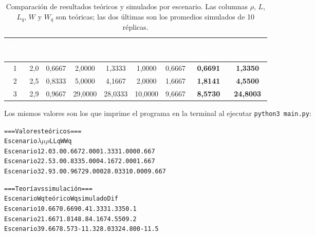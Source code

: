 \documentclass[11pt,a4paper]{article}
\renewcommand{\arraystretch}{1.08}
\begin{document}
\begin{table}[h!]
\centering
\setlength{\arrayrulewidth}{0.75pt}
\renewcommand{\arraystretch}{1.3}
\small
\begin{tabular}{|c|c|c|c|c|c|c|c|c|}
\hline
\rowcolor{headerblue}
\textbf{\textcolor{white}{Esc.}} &
\textbf{\textcolor{white}{$\lambda$}} &
\textbf{\textcolor{white}{$\rho$}} &
\textbf{\textcolor{white}{$L$}} &
\textbf{\textcolor{white}{$L_q$}} &
\textbf{\textcolor{white}{$W$}} &
\textbf{\textcolor{white}{$W_q$}} &
\makecell{\textbf{\textcolor{white}{Espera}} \\ \textbf{\textcolor{white}{simulada}}} &
\makecell{\textbf{\textcolor{white}{Cola}} \\ \textbf{\textcolor{white}{simulada}}} \\ \hline
1 & 2{,}0 & 0{,}6667 & 2{,}0000 & 1{,}3333 & 1{,}0000 & 0{,}6667 & \textbf{0{,}6691} & \textbf{1{,}3350} \\ \hline
\rowcolor{rowlight}
2 & 2{,}5 & 0{,}8333 & 5{,}0000 & 4{,}1667 & 2{,}0000 & 1{,}6667 & \textbf{1{,}8141} & \textbf{4{,}5500} \\ \hline
3 & 2{,}9 & 0{,}9667 & 29{,}0000 & 28{,}0333 & 10{,}0000 & 9{,}6667 & \textbf{8{,}5730} & \textbf{24{,}8003} \\ \hline
\end{tabular}
\caption{Comparación de resultados teóricos y simulados por escenario. Las columnas
$\rho$, $L$, $L_q$, $W$ y $W_q$ son teóricas; las dos últimas son los promedios
simulados de 10 réplicas.}
\label{tab:comparacion}
\end{table}

Los mismos valores son los que imprime el programa en la terminal al ejecutar
\texttt{python3 main.py}:

\begin{alltt}\small
=== Valores teóricos ===
Escenario          \(\lambda\)     \(\mu\)        \(\rho\)        L       Lq        W       Wq
Escenario 1      2.0   3.0    0.667    2.000    1.333    1.000    0.667
Escenario 2      2.5   3.0    0.833    5.000    4.167    2.000    1.667
Escenario 3      2.9   3.0    0.967   29.000   28.033   10.000    9.667

=== Teoría vs simulación ===
Escenario       Wq teórico  Wq simulado   Dif %
Escenario 1          0.667        0.669     0.4        1.333        1.335     0.1
Escenario 2          1.667        1.814     8.8        4.167        4.550     9.2
Escenario 3          9.667        8.573   -11.3       28.033       24.800   -11.5
\end{alltt}
\end{document}
